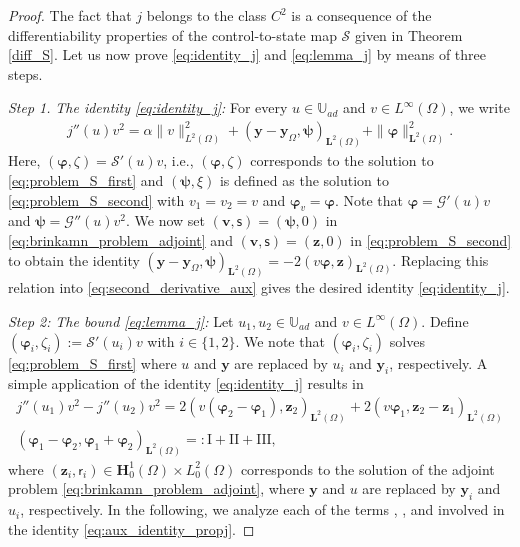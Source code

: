 \documentclass[final]{siamart0216}
\begin{document}
\begin{proof}
The fact that $j$ belongs to the class $C^2$ is a consequence of the differentiability properties of the control-to-state map $\mathcal{S}$ given in Theorem \ref{diff_S}. Let us now prove \eqref{eq:identity_j} and \eqref{eq:lemma_j} by means of three steps.

\emph{Step 1.} \emph{The identity \eqref{eq:identity_j}:} For every $u\in\mathbb{U}_{ad}$ and $v \in L^{\infty}(\Omega)$, we write
\begin{align}\label{eq:second_derivative_aux}
j''(u)v^2 =\alpha\|v\|_{L^2(\Omega)}^2+(\mathbf{y}-\mathbf{y}_{\Omega},\boldsymbol{\psi})_{\mathbf{L}^2(\Omega)}+\|\boldsymbol{\varphi}\|_{\mathbf{L}^2(\Omega)}^2.
\end{align}
Here, $(\boldsymbol{\varphi},\zeta) = \mathcal{S}'(u)v$, i.e., $(\boldsymbol{\varphi},\zeta)$ corresponds to the solution to \eqref{eq:problem_S_first} and
$(\boldsymbol{\psi},\xi)$ is defined as the solution to \eqref{eq:problem_S_second} with $v_1 = v_2 = v$ and $\boldsymbol{\varphi}_{v} = \boldsymbol{\varphi}$. Note that $\boldsymbol{\varphi}=\mathcal{G}'(u)v$ and $\boldsymbol{\psi}=\mathcal{G}''(u)v^2$. We now set $(\mathbf{v},\mathsf{s})=(\boldsymbol{\psi},0)$ in \eqref{eq:brinkamn_problem_adjoint} and $(\mathbf{v},\mathsf{s}) = (\mathbf{z},0)$ in \eqref{eq:problem_S_second} to obtain the identity $(\mathbf{y}-\mathbf{y}_{\Omega},\boldsymbol{\psi})_{\mathbf{L}^2(\Omega)}=-2(v\boldsymbol{\varphi},\mathbf{z})_{\mathbf{L}^2(\Omega)}$. Replacing this relation into \eqref{eq:second_derivative_aux} gives the desired identity \eqref{eq:identity_j}.


\emph{Step 2:} \emph{The bound \eqref{eq:lemma_j}:} Let $u_1,u_2\in \mathbb{U}_{ad}$ and $v\in L^{\infty}(\Omega)$. Define $(\boldsymbol{\varphi}_i,\zeta_i):=\mathcal{S}'(u_i)v$ with $i \in \{ 1,2 \}$. We note that $(\boldsymbol{\varphi}_i,\zeta_i)$ solves \eqref{eq:problem_S_first} where $u$ and $\mathbf{y}$ are replaced by $u_i$ and $\mathbf{y}_i$, respectively. A simple application of the identity \eqref{eq:identity_j} results in
\begin{multline}
\label{eq:aux_identity_propj}
j''(u_1)v^2-j''(u_2)v^2=2(v(\boldsymbol{\varphi}_2-\boldsymbol{\varphi}_1),\mathbf{z}_2)_{\mathbf{L}^2(\Omega)}+2(v\boldsymbol{\varphi}_1,\mathbf{z}_2-\mathbf{z}_1)_{\mathbf{L}^2(\Omega)}\\
(\boldsymbol{\varphi}_1-\boldsymbol{\varphi}_2,\boldsymbol{\varphi}_1+\boldsymbol{\varphi}_2)_{\mathbf{L}^2(\Omega)}=:\text{I}+\text{II}+\text{III},
\end{multline}
where $(\mathbf{z}_i,\mathsf{r}_i) \in\mathbf{H}_0^1(\Omega) \times L_0^2(\Omega)$ corresponds to the solution of the adjoint problem \eqref{eq:brinkamn_problem_adjoint}, where $\mathbf{y}$ and $u$ are replaced by $\mathbf{y}_i$ and $u_i$, respectively. In the following, we analyze each of the terms , , and  involved in the identity \eqref{eq:aux_identity_propj}.


\end{proof}
\end{document}
